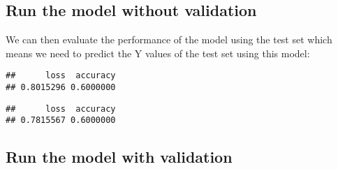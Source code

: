 \documentclass[
]{book}
\newenvironment{Shaded}{\begin{snugshade}}{\end{snugshade}}
\newcommand{\DataTypeTok}[1]{\textcolor[rgb]{0.13,0.29,0.53}{#1}}
\newcommand{\DecValTok}[1]{\textcolor[rgb]{0.00,0.00,0.81}{#1}}
\newcommand{\KeywordTok}[1]{\textcolor[rgb]{0.13,0.29,0.53}{\textbf{#1}}}
\newcommand{\NormalTok}[1]{#1}
\newcommand{\OperatorTok}[1]{\textcolor[rgb]{0.81,0.36,0.00}{\textbf{#1}}}
\newcommand{\StringTok}[1]{\textcolor[rgb]{0.31,0.60,0.02}{#1}}
\begin{document}
\hypertarget{run-the-model-without-validation-1}{%
\subsection{Run the model without validation}\label{run-the-model-without-validation-1}}

\begin{Shaded}
\end{Shaded}

We can then evaluate the performance of the model using the test set which means we need to predict the Y values of the test set using this model:

\begin{Shaded}
\end{Shaded}

\begin{verbatim}
##      loss  accuracy 
## 0.8015296 0.6000000
\end{verbatim}

\begin{Shaded}
\end{Shaded}

\begin{verbatim}
##      loss  accuracy 
## 0.7815567 0.6000000
\end{verbatim}

\hypertarget{run-the-model-with-validation-1}{%
\subsection{Run the model with validation}\label{run-the-model-with-validation-1}}
\end{document}
